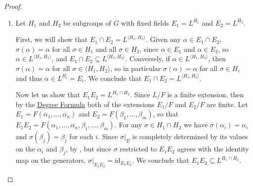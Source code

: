 \documentclass[12pt]{report}
\numberwithin{equation}{section}
\numberwithin{theorem}{chapter}
\theoremstyle{definition}
\newtheorem*{basic properties}{Basic Properties}
\newtheorem*{Important Remark}{Important Remark}
\DeclareMathOperator{\Gal}{Gal}
\begin{document}
\begin{proof}
\begin{enumerate}[leftmargin=20pt,label=(\alph*)]
For each $\sigma \in G$, we claim that $\sigma(E) \subseteq E$. By , for all $\alpha \in E$ the element $\sigma(\alpha)$ is also a root of $m_{\alpha,F}$. But since $E/F$ is Galois, it must contain all of the roots of $m_{\alpha,F}$, by , so $\sigma(\alpha) \in E$. Thus $\sigma(E) \subseteq E$, so the restriction of $\sigma$ to $E$ determines an injective field homomorphism $\sigma|_E: E \to E$. Since $\sigma|_F = \mathrm{id}_F$, this map is also a linear transformation of vector spaces over $F$. But $E$ is a finite vector space over $F$, and any injective linear transformation $E \to E$ must be bijective. We conclude that $\sigma|_E$ is an automorphism of $E$. We thus have a well-defined function
$$\xymatrix@R=1mm{\phi: G \ar[r] & \Gal(E/F) \\ \sigma \ar@{|->}[r] & \phi(\sigma) = \sigma|_E.}$$
Moreover, this map is a group homomorphism by construction. The kernel is the subgroup of $G$ of automorphisms that restrict to the identity on $E$, which is precisely $N$. Hence we have an induced injective group homomorphism
$$\overline{\phi}: G/N \to \Gal(E/F).$$
But $|N| = |\Gal(E/F)|<\infty$, so this map $\overline{\phi}$ must be an isomorphism.

\item Let $H_1$ and $H_2$ be subgroups of $G$ with fixed fields $E_1 = L^{H_1}$ and $E_2 = L^{H_2}$. 

First, we will show that $E_1 \cap E_2 = L^{\langle H_1, H_2 \rangle}$.
Given any $\alpha \in E_1 \cap E_2$, $\sigma(\alpha) = \alpha$ for all $\sigma \in H_1$ and all $\sigma \in H_2$, since $\alpha \in E_1$ and $\alpha \in E_2$, so $\alpha \in L^{\langle H_1, H_2 \rangle}$, and $E_1 \cap E_2 \subseteq L^{\langle H_1, H_2 \rangle}$. Conversely, if $\alpha \in L^{\langle H_1, H_2 \rangle}$, then $\sigma(\alpha) = \alpha$ for all $\sigma \in \langle H_1, H_2 \rangle$, so in particular $\sigma(\alpha) = \alpha$ for all $\sigma \in H_i$ and thus $\alpha \in L^{H_i} = E_i$. We conclude that $E_1 \cap E_2 = L^{\langle H_1, H_2 \rangle}$.

Now let us show that $E_1 E_2 = L^{H_1 \cap H_2}$. Since $L/F$ is a finite extension, then by the \hyperref[deg formula]{Degree Formula} both of the extensions $E_1/F$ and $E_2/F$ are finite. Let $E_1 = F(\alpha_1, \ldots, \alpha_n)$ and $E_2 = F(\beta_1, \ldots, \beta_m)$, so that $E_1E_2 = F(\alpha_1, \ldots, \alpha_n, \beta_1, \ldots, \beta_m)$. For any $\sigma \in H_1 \cap H_2$ we have $\sigma(\alpha_i) = \alpha_i$ and $\sigma(\beta_j) = \beta_j$ for each $i$. Since $\sigma|_E$ is completely determined by its values on the $\alpha_i$ and $\beta_j$, by , but since $\sigma$ restricted to $E_1E_2$ agrees with the identity map on the generators, $\sigma|_{E_1 E_2} = \mathrm{id}_{E_1 E_2}$. We conclude that $E_1 E_2 \subseteq L^{H_1 \cap H_2}$.


\end{enumerate}
\end{proof}
\end{document}

